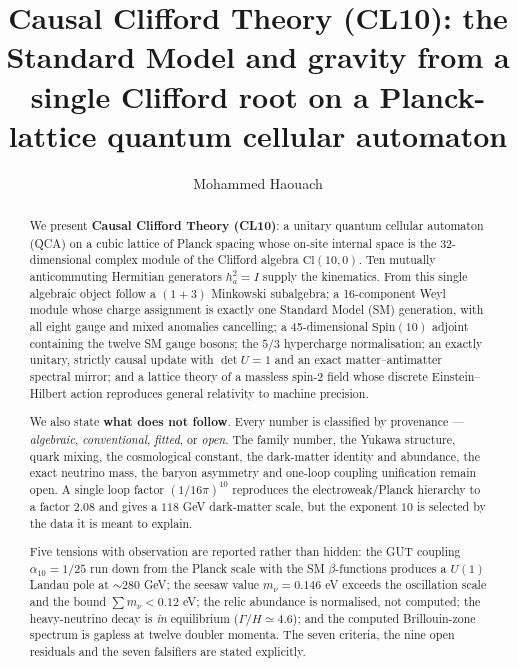 \documentclass[aps,prd,twocolumn,amsmath,amssymb,superscriptaddress,nofootinbib,floatfix]{revtex4-2}
\begin{document}
\title{Causal Clifford Theory (CL10): the Standard Model and gravity
from a single Clifford root on a Planck-lattice quantum cellular
automaton}
\author{Mohammed Haouach}
\begin{abstract}
We present \textbf{Causal Clifford Theory (CL10)}: a unitary quantum
cellular automaton (QCA) on a cubic lattice of Planck spacing whose
on-site internal space is the 32-dimensional complex module of the
Clifford algebra \(\mathrm{Cl}(10,0)\). Ten mutually anticommuting
Hermitian generators \(h_a^2 = I\) supply the kinematics. From this
single algebraic object follow a \((1{+}3)\) Minkowski subalgebra; a
16-component Weyl module whose charge assignment is exactly one Standard
Model (SM) generation, with all eight gauge and mixed anomalies
cancelling; a 45-dimensional \(\mathrm{Spin}(10)\) adjoint containing
the twelve SM gauge bosons; the \(5/3\) hypercharge normalisation; an
exactly unitary, strictly causal update with \(\det U = 1\) and an exact
matter--antimatter spectral mirror; and a lattice theory of a massless
spin-2 field whose discrete Einstein--Hilbert action reproduces general
relativity to machine precision.

We also state \textbf{what does not follow}. Every number is classified
by provenance --- \emph{algebraic}, \emph{conventional}, \emph{fitted},
or \emph{open}. The family number, the Yukawa structure, quark mixing,
the cosmological constant, the dark-matter identity and abundance, the
exact neutrino mass, the baryon asymmetry and one-loop coupling
unification remain open. A single loop factor \((1/16\pi)^{10}\)
reproduces the electroweak/Planck hierarchy to a factor \(2.08\) and
gives a \(118\) GeV dark-matter scale, but the exponent \(10\) is
selected by the data it is meant to explain.

Five tensions with observation are reported rather than hidden: the GUT
coupling \(\alpha_{10} = 1/25\) run down from the Planck scale with the
SM \(\beta\)-functions produces a \(U(1)\) Landau pole at \(\sim 280\)
GeV; the seesaw value \(m_\nu = 0.146\) eV exceeds the oscillation scale
and the bound \(\sum m_\nu < 0.12\) eV; the relic abundance is
normalised, not computed; the heavy-neutrino decay is \emph{in}
equilibrium (\(\Gamma/H \simeq 4.6\)); and the computed Brillouin-zone
spectrum is gapless at twelve doubler momenta. The seven criteria, the
nine open residuals and the seven falsifiers are stated explicitly.
\end{abstract}
\maketitle
\end{document}
